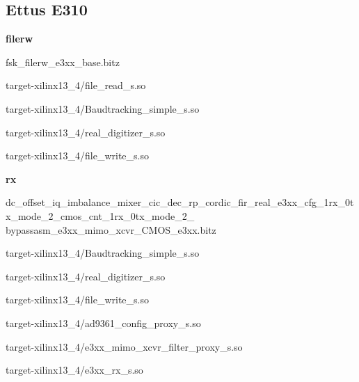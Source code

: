 \subsection{Ettus E310}
	\noindent\textbf{filerw}
	\begin{itemize}
	\begin{minipage}[t]{.5\textwidth}
	\item fsk\_filerw\_e3xx\_base.bitz

	\item target-xilinx13\_4/file\_read\_s.so
	\item target-xilinx13\_4/Baudtracking\_simple\_s.so
	\end{minipage}
	\begin{minipage}[t]{.5\textwidth}
	\item target-xilinx13\_4/real\_digitizer\_s.so
	\item target-xilinx13\_4/file\_write\_s.so
	\end{minipage}
	\end{itemize}

	\noindent\textbf{rx}
	\begin{itemize}
  \item dc\_offset\_iq\_imbalance\_mixer\_cic\_dec\_rp\_cordic\_fir\_real\_e3xx\_cfg\_1rx\_0tx\_mode\_2\_cmos\_cnt\_1rx\_0tx\_mode\_2\_ \\
	bypassasm\_e3xx\_mimo\_xcvr\_CMOS\_e3xx.bitz \\

	\begin{minipage}[t]{.5\textwidth}
	\item target-xilinx13\_4/Baudtracking\_simple\_s.so
	\item target-xilinx13\_4/real\_digitizer\_s.so
	\item target-xilinx13\_4/file\_write\_s.so
	\end{minipage}
	\begin{minipage}[t]{.5\textwidth}
	\item target-xilinx13\_4/ad9361\_config\_proxy\_s.so
	\item target-xilinx13\_4/e3xx\_mimo\_xcvr\_filter\_proxy\_s.so
	\item target-xilinx13\_4/e3xx\_rx\_s.so
	\end{minipage}
	\end{itemize}

